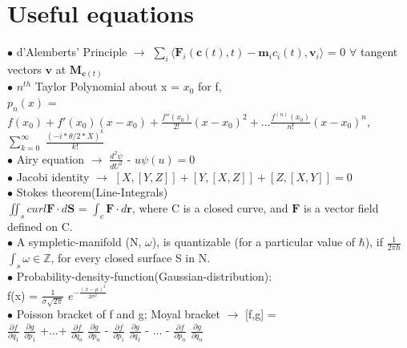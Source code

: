 \documentclass[10pt,fancy]{elegantbook}
\begin{document}
{\section{Useful equations}

$\bullet$  d'Alemberts' Principle $\longrightarrow$  $\sum_i \langle \mathbf {F}_i(\mathbf c(t),t) - \mathbf {m}_i {c_i(t)}, \mathbf {v}_{i} \rangle$ = 0 $\forall$ tangent vectors $\mathbf v$ at $\mathbf {M}_{\mathbf c(t)}$  \\

$\bullet$  $n^{th}$ Taylor Polynomial about x = $x_0$ for f,  \\   
$p_n(x)$ = $f(x_0) + f'(x_0)(x - x_0) + \frac{f''(x_0)}{2!}(x - x_0)^2 +...\frac{f^{(n)}{(x_0)}}{n!}(x - x_0)^n $,  \\    
$\sum_{k=0}^\infty$ $\frac{ ({-i} * {\theta / 2} * {X} )^k} {k!}$  \\

$\bullet$ Airy equation $\longrightarrow$ $\frac{d^2 \psi} {dU^2}$ - $u \psi (u) = 0$  \\

$\bullet$ Jacobi identity $\longrightarrow$ $[X,[Y,Z]] + [Y,[X,Z]] + [Z, [X,Y]] = 0$  \\

$\bullet$ Stokes theorem(Line-Integrals)  \\
$\iint_s curl \mathbf F \cdot d \mathbf S$ = $\int_c \mathbf F \cdot d \mathbf r$, where C is a closed curve, and $\mathbf F$ is a vector field defined on C. \\

$\bullet$ A sympletic-manifold (N, $\omega$), is quantizable (for a particular value of $\hbar$), if
$\frac{1}{{2 \pi \hbar}}$ $\int_s \omega \in \mathbb Z$, for every closed surface S in N.  \\

$\bullet$ Probability-density-function(Gaussian-distribution):  \\
f(x) = $\frac{1}{\sigma \sqrt{2 \pi}}$ $e^{- \frac{(x - \mu)^2}{2 \sigma^2}}$ \\

$\bullet$ Poisson bracket of f and g;  Moyal bracket $\longrightarrow$ [f,g] = \\
$\frac{\partial f}{\partial q_1}$ $\frac{\partial g}{\partial p_1}$ +...+ $\frac{\partial f}{\partial q_n}$ $\frac{\partial g}{\partial p_n}$ - $\frac{\partial f}{\partial p_1}$ $\frac{\partial g}{\partial q_1}$ - ... - $\frac{\partial f}{\partial p_n}$ $\frac{\partial g}{\partial q_n}$ \\

}
\end{document}
